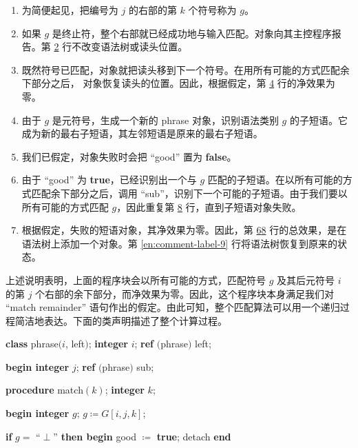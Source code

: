 \begin{enumerate}[leftmargin=*, itemindent=2.2\parindent, nosep, label=第 \arabic* 行.]
	\item 为简便起见，把编号为 $j$ 的右部的第 $k$ 个符号称为 $g$。
	\item 如果 $g$ 是终止符，整个右部就已经成功地与输入匹配。对象向其主控程序报告。第 \hyperref[en:comment-label-2]{2} 行不改变语法树或读头位置。

	\setcounter{enumi}{3}
	\item 既然符号已匹配，对象就把读头移到下一个符号。在用所有可能的方式匹配余下部分之后，
	对象恢复读头的位置。因此，根据假定，第 \hyperref[en:comment-label-4]{4} 行的净效果为零。
	
	\setcounter{enumi}{5}
	\item 由于 $g$ 是元符号，生成一个新的 phrase 对象，识别语法类别 $g$ 的子短语。它成为新的最右子短语，其左邻短语是原来的最右子短语。
	
	\item 我们已假定，对象失败时会把 ``good'' 置为 \textbf{false}。
	
	\item 由于 ``good'' 为 \textbf{true}，已经识别出一个与 $g$ 匹配的子短语。在以所有可能的方式匹配余下部分之后，调用 ``sub''，识别下一个可能的子短语。由于我们要以所有可能的方式匹配 $g$，因此重复第 \hyperref[en:comment-label-8]{8} 行，直到子短语对象失败。
	
	\item 根据假定，失败的短语对象，其净效果为零。因此，第 \hyperref[en:comment-label-6]{6}\textendash\hyperref[en:comment-label-8]{8} 行的总效果，是在语法树上添加一个对象。第 \ref{en:comment-label-9} 行将语法树恢复到原来的状态。
\end{enumerate}

上述说明表明，上面的程序块会以所有可能的方式，匹配符号 $g$ 及其后元符号 $i$ 的第 $j$ 个右部的余下部分，而净效果为零。因此，这个程序块本身满足我们对 ``match remainder'' 语句作出的假定。由此可知，整个匹配算法可以用一个递归过程简洁地表达。下面的类声明描述了整个计算过程。

\quad \textbf{class} phrase$(i$, left$)$; \textbf{integer} $i$; \textbf{ref} $($phrase$)$ left;

\quad \textbf{begin integer} $j$; \textbf{ref} $($phrase$)$ sub;

\quad \quad \textbf{procedure} match$(k)$; \textbf{integer} $k$;

\quad \quad \textbf{begin integer} $g$; $g\coloneq G[i,j, k]$;

\quad \quad \quad \textbf{if} $g =$ ``$\perp$'' \textbf{then begin} good $\coloneq$ \textbf{true}; detach \textbf{end}

